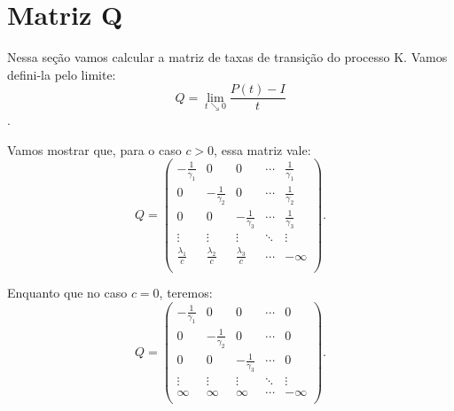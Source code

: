 
\section{Matriz Q}
\label{sec:matrizq}

Nessa seção vamos calcular a matriz de taxas de transição do 
processo K. Vamos defini-la pelo limite:
\begin{displaymath}
  Q = \lim_{t \searrow 0} \frac{P(t) - I}{t} 
\end{displaymath}.

Vamos mostrar que, para o caso $c > 0$, essa matriz vale:
\begin{displaymath}
  Q = \left(
    \begin{array}{ccccc}
      -\frac{1}{\gamma_1} & 0 & 0 & \cdots & \frac{1}{\gamma_1}\\
      0 & -\frac{1}{\gamma_2} & 0 & \cdots & \frac{1}{\gamma_2}\\
      0 & 0 & -\frac{1}{\gamma_3} & \cdots & \frac{1}{\gamma_3}\\
      \vdots & \vdots & \vdots & \ddots & \vdots \\
      \frac{\lambda_1}{c} & \frac{\lambda_2}{c} &
      \frac{\lambda_3}{c} & \cdots & -\infty\\
    \end{array}
  \right).
\end{displaymath}

Enquanto que no caso $c=0$, teremos:
\begin{displaymath}
  Q = \left(
    \begin{array}{ccccc}
      -\frac{1}{\gamma_1} & 0 & 0 & \cdots & 0\\
      0 & -\frac{1}{\gamma_2} & 0 & \cdots & 0\\
      0 & 0 & -\frac{1}{\gamma_3} & \cdots & 0\\
      \vdots & \vdots & \vdots & \ddots & \vdots \\
      \infty & \infty & \infty & \cdots & -\infty\\
    \end{array}
  \right).
\end{displaymath}

